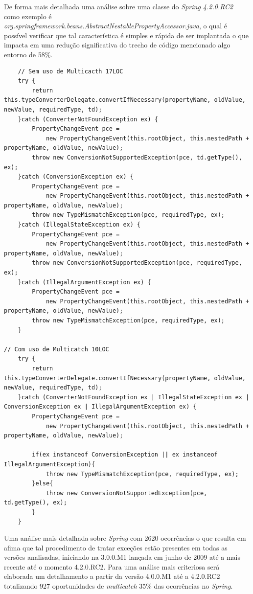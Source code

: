 De forma mais detalhada uma análise sobre uma classe do \textit{Spring 4.2.0.RC2} como exemplo é  \textit{org.springframework.beans.AbstractNestablePropertyAccessor.java}, o qual é possível verificar que tal característica é simples e rápida de ser implantada o que impacta em uma redução significativa do trecho de código mencionado algo entorno de 58\%.\\
\begin{lstlisting}
	// Sem uso de Multicacth 17LOC
	try {
		return this.typeConverterDelegate.convertIfNecessary(propertyName, oldValue, newValue, requiredType, td);
	}catch (ConverterNotFoundException ex) {
		PropertyChangeEvent pce =
			new PropertyChangeEvent(this.rootObject, this.nestedPath + propertyName, oldValue, newValue);
		throw new ConversionNotSupportedException(pce, td.getType(), ex);
	}catch (ConversionException ex) {
		PropertyChangeEvent pce =
			new PropertyChangeEvent(this.rootObject, this.nestedPath + propertyName, oldValue, newValue);
		throw new TypeMismatchException(pce, requiredType, ex);
	}catch (IllegalStateException ex) {
		PropertyChangeEvent pce =
			new PropertyChangeEvent(this.rootObject, this.nestedPath + propertyName, oldValue, newValue);
		throw new ConversionNotSupportedException(pce, requiredType, ex);
	}catch (IllegalArgumentException ex) {
		PropertyChangeEvent pce =
			new PropertyChangeEvent(this.rootObject, this.nestedPath + propertyName, oldValue, newValue);
		throw new TypeMismatchException(pce, requiredType, ex);
	}
	
// Com uso de Multicatch 10LOC
	try {
		return this.typeConverterDelegate.convertIfNecessary(propertyName, oldValue, newValue, requiredType, td);
	}catch (ConverterNotFoundException ex | IllegalStateException ex | ConversionException ex | IllegalArgumentException ex) {
		PropertyChangeEvent pce = 
			new PropertyChangeEvent(this.rootObject, this.nestedPath + propertyName, oldValue, newValue);
		
		if(ex instanceof ConversionException || ex instanceof IllegalArgumentException){
			throw new TypeMismatchException(pce, requiredType, ex);
		}else{
			throw new ConversionNotSupportedException(pce, td.getType(), ex);
		}
	}	
\end{lstlisting}
 

Uma análise mais detalhada sobre \textit{Spring} com 2620 ocorrências o que resulta em  afima que tal procedimento de tratar exceções estão presentes em todas as versões analisadas, iniciando na 3.0.0.M1 lançada em junho de 2009 até a mais recente até o momento 4.2.0.RC2. Para uma análise mais criteriosa será elaborada um detalhamento a partir da versão 4.0.0.M1 até a 4.2.0.RC2 totalizando 927 oportunidades de \textit{multicatch} 35\% das ocorrências no \textit{Spring}.\\

